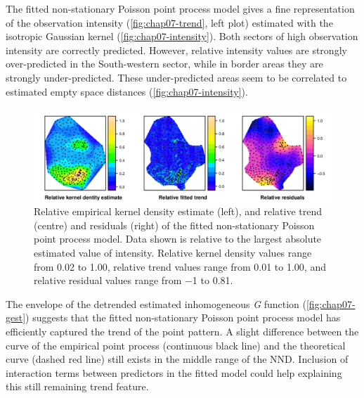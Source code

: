 The fitted non-stationary Poisson point process model gives a fine representation of the observation intensity 
(\autoref{fig:chap07-trend}, left plot) estimated with the isotropic Gaussian kernel 
(\autoref{fig:chap07-intensity}). Both sectors of high observation intensity are correctly predicted. However, 
relative intensity values are strongly over-predicted in the South-western sector, while in border areas they 
are strongly under-predicted. These under-predicted areas seem to be correlated to estimated empty space 
distances (\autoref{fig:chap07-intensity}).

\begin{figure}[!h]
 \centering
 \includegraphics[width=\textwidth]{fig/chap07-kernel-trend-res}
 \caption[Relative empirical kernel density estimate, and relative trend and residuals of the fitted 
non-stationary Poisson point process model.]{Relative empirical kernel density estimate (left), and relative 
trend (centre) and residuals (right) of the fitted non-stationary Poisson point process model. Data shown is 
relative to the largest absolute estimated value of intensity. Relative kernel density values range from 
\num{0.02} to \num{1.00}, relative trend values range from \num{0.01} to \num{1.00}, and relative residual 
values range from \num{-1} to \num{0.81}.}
\label{fig:chap07-trend}
\end{figure}

The envelope of the detrended estimated inhomogeneous \emph{G} function (\autoref{fig:chap07-gest}) suggests 
that the fitted non-stationary Poisson point process model has efficiently captured the trend of the point 
pattern. A slight difference between the curve of the empirical point process (continuous black line) and the 
theoretical curve (dashed red line) still exists in the middle range of the NND. Inclusion of interaction terms 
between predictors in the fitted model could help explaining this still 
remaining trend feature.

